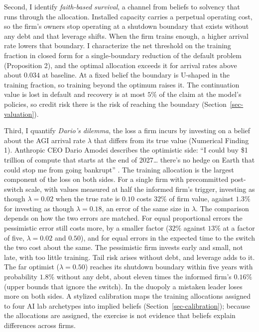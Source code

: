 \documentclass[
  11pt,
  letterpaper,
]{scrartcl}
\begin{document}
Second, I identify \emph{faith-based survival}, a channel from beliefs
to solvency that runs through the allocation. Installed capacity carries
a perpetual operating cost, so the firm's owners stop operating at a
shutdown boundary that exists without any debt and that leverage shifts.
When the firm trains enough, a higher arrival rate lowers that boundary.
I characterize the net threshold on the training fraction in closed form
for a single-boundary reduction of the default problem (Proposition 2),
and the optimal allocation exceeds it for arrival rates above about
\(0.034\) at baseline. At a fixed belief the boundary is U-shaped in the
training fraction, so training beyond the optimum raises it. The
continuation value is lost in default and recovery is at most \(5\%\) of
the claim at the model's policies, so credit risk there is the risk of
reaching the boundary (Section~\ref{sec-valuation}).

Third, I quantify \emph{Dario's dilemma}, the loss a firm incurs by
investing on a belief about the AGI arrival rate \(\lambda\) that
differs from its true value (Numerical Finding 1). Anthropic CEO Dario
Amodei describes the optimistic side: ``I could buy \$1 trillion of
compute that starts at the end of 2027\ldots{} there's no hedge on Earth
that could stop me from going bankrupt'' \citep{amodei2026dwarkesh}. The
training allocation is the largest component of the loss on both sides.
For a single firm with precommitted post-switch scale, with values
measured at half the informed firm's trigger, investing as though
\(\lambda = 0.02\) when the true rate is \(0.10\) costs \(32\%\) of firm
value, against \(1.3\%\) for investing as though \(\lambda = 0.18\), an
error of the same size in \(\lambda\). The comparison depends on how the
two errors are matched. For equal proportional errors the pessimistic
error still costs more, by a smaller factor (\(32\%\) against \(13\%\)
at a factor of five, \(\lambda = 0.02\) and \(0.50\)), and for equal
errors in the expected time to the switch the two cost about the same.
The pessimistic firm invests early and small, not late, with too little
training. Tail risk arises without debt, and leverage adds to it. The
far optimist (\(\lambda = 0.50\)) reaches its shutdown boundary within
five years with probability \(1.8\%\) without any debt, about eleven
times the informed firm's \(0.16\%\) (upper bounds that ignore the
switch). In the duopoly a mistaken leader loses more on both sides. A
stylized calibration maps the training allocations assigned to four AI
lab archetypes into implied beliefs (Section~\ref{sec-calibration});
because the allocations are assigned, the exercise is not evidence that
beliefs explain differences across firms.
\end{document}
